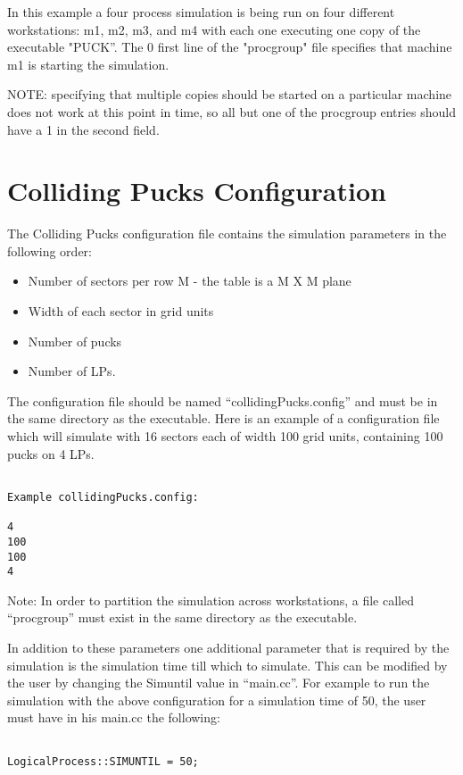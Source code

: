 In this example a four process simulation is being run on four different
workstations: m1, m2, m3, and m4 with each one executing one copy of the
executable "PUCK''.  The 0 first line of the "procgroup" file specifies
that machine m1 is starting the simulation.

NOTE: specifying that multiple copies should be started on a particular
machine does not work at this point in time, so all but one of the
procgroup entries should have a 1 in the second field.

\section*{Colliding Pucks Configuration}

The Colliding Pucks configuration file contains the simulation parameters in
the following order:
\begin{itemize}
\item Number of sectors per row M - the table is  a M X M plane
\item Width of each sector in grid units
\item Number of pucks
\item Number of LPs.

\end{itemize}

The configuration file should be named ``collidingPucks.config'' and must
be in the same directory as the executable. Here is an example of a
configuration file which will simulate with 16 sectors each of width 100
grid units, containing 100 pucks on 4 LPs.

\begin{verbatim}

Example collidingPucks.config:

4
100
100
4

\end{verbatim}

Note: In order to partition the simulation across workstations, a file
called ``procgroup'' must exist in the same directory as the executable.

In addition to these parameters one additional parameter that is required
by the simulation is the simulation time till which to simulate. This can
be modified by the user by changing the Simuntil value in ``main.cc''. For
example to run the simulation with the above configuration for a
simulation time of 50, the user must have in his main.cc the following:
\begin{verbatim}

LogicalProcess::SIMUNTIL = 50;
 
\end{verbatim}

